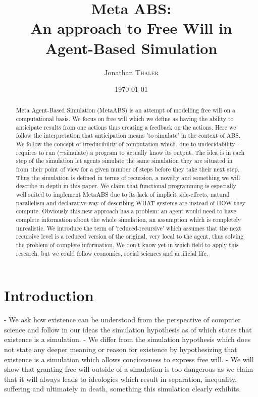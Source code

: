 \documentclass{article}
\title{Meta ABS: \\ An approach to Free Will in Agent-Based Simulation} %
\author{Jonathan \textsc{Thaler}} %
\date{\today} %
\begin{document}
\maketitle %

\begin{abstract}
Meta Agent-Based Simulation (MetaABS) is an attempt of modelling free will on a computational basis. We focus on free will which we define as having the ability to anticipate results from one actions thus creating a feedback on the actions. Here we follow the interpretation that anticipation means 'to simulate' in the context of ABS. We follow the concept of irreducibility of computation which, due to undecidability - requires to run (=simulate) a program to actually know its output. The idea is in each step of the simulation let agents simulate the same simulation they are situated in from their point of view for a given number of steps before they take their next step. Thus the simulation is defined in terms of recursion, a novelty and something we will describe in depth in this paper. We claim that functional programming is especially well suited to implement MetaABS due to its lack of implicit side-effects, natural parallelism and declarative way of describing WHAT systems are instead of HOW they compute. Obviously this new approach has a problem: an agent would need to have complete information about the whole simulation, an assumption which is completely unrealistic. We introduce the term of 'reduced-recursive' which assumes that the next recursive level is a reduced version of the original, very local to the agent, thus solving the problem of complete information.
We don't know yet in which field to apply this research, but we could follow economics, social sciences and artificial life.
\end{abstract}

\section{Introduction}
- We ask how existence can be understood from the perspective of computer science and follow in our ideas the simulation hypothesis as of \cite{bostrom_are_2003} which states that existence is a simulation. 
- We differ from the simulation hypothesis which does not state any deeper meaning or reason for existence by hypothesizing that existence is a simulation which allows conciousness to express free will.
- We will show that granting free will outside of a simulation is too dangerous as we claim that it will always leads to ideologies which result in separation, inequality, suffering and ultimately in death, something this simulation clearly exhibits.
\end{document}

